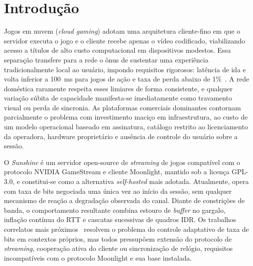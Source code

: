 \section{Introdução}\label{sec:introducao}

Jogos em nuvem (\emph{cloud gaming}) adotam uma arquitetura
cliente-fino em que o servidor executa o jogo e o cliente
recebe apenas o vídeo codificado, viabilizando acesso a
títulos de alto custo computacional em dispositivos modestos.
Essa separação transfere para a rede o ônus de sustentar uma
experiência tradicionalmente local ao usuário, impondo
requisitos rigorosos: latência de ida e volta inferior a
\SI{100}{\milli\second} para jogos de ação e taxa de perda
abaixo de 1\%~\cite{baldovino2022}. A rede doméstica raramente
respeita esses limiares de forma consistente, e qualquer
variação súbita de capacidade manifesta-se imediatamente como
travamento visual ou perda de sincronia. As plataformas
comerciais dominantes contornam parcialmente o problema com
investimento maciço em infraestrutura, ao custo de um modelo
operacional baseado em assinatura, catálogo restrito ao
licenciamento da operadora, hardware proprietário e ausência
de controle do usuário sobre a sessão.

O \emph{Sunshine} é um servidor open-source de \emph{streaming}
de jogos compatível com o protocolo NVIDIA GameStream e
cliente Moonlight, mantido sob a licença GPL-3.0, e
constitui-se como a alternativa \emph{self-hosted} mais
adotada. Atualmente, opera com taxa de bits negociada uma
única vez ao início da sessão, sem qualquer mecanismo de
reação a degradação observada do canal. Diante de constrições
de banda, o comportamento resultante combina estouro de
\emph{buffer} no gargalo, inflação contínua do RTT e cascatas
sucessivas de quadros IDR. Os trabalhos correlatos mais
próximos~\cite{alos2019,abragame,gcc} resolvem o problema do
controle adaptativo de taxa de bits em contextos próprios,
mas todos pressupõem extensão do protocolo de \emph{streaming},
cooperação ativa do cliente ou sincronização de relógio,
requisitos incompatíveis com o protocolo Moonlight e sua base
instalada.

